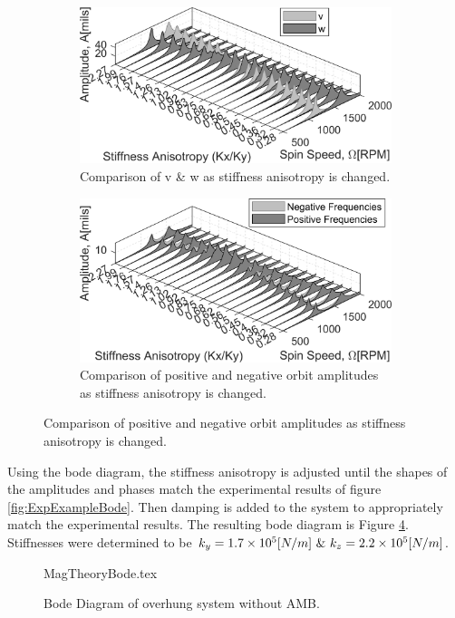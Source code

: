 \begin{figure}
\begin{subfigure}{\textwidth/2}
	\centering
	\includegraphics[width=\linewidth]{./figures/MagExampleHorVertStiffAniCompare.png}
	\caption{Comparison of v \& w as stiffness anisotropy is changed.}
	\label{fig:HorVertStiffAniCompare}
\end{subfigure}
\begin{subfigure}{\textwidth/2}
	\centering
	\includegraphics[width=\linewidth]{./figures/MagExamplePosNegStiffAniCompare.png}
	\caption{Comparison of positive and negative orbit amplitudes as stiffness anisotropy is changed.}
	\label{fig:PosNegStiffAniCompare}
\end{subfigure}
\end{figure}
Using the bode diagram, the stiffness anisotropy is adjusted until the shapes of the amplitudes and phases match the experimental results of figure \ref{fig:ExpExampleBode}. Then damping is added to the system to appropriately match the experimental results. The resulting bode diagram is Figure \ref{fig:MagTheoryBode}. Stiffnesses were determined to be $ k_y=1.7\e{5}[N/m]\ \&\ k_z=2.2\e{5}[N/m] $.
\begin{figure}[!htb]
	\def\width{.6\linewidth}
	\def\height{.4\linewidth}
	\def\sep{3em}
	\centering
	{MagTheoryBode.tex}
	\caption{Bode Diagram of overhung system without AMB.}
	\label{fig:MagTheoryBode}
\end{figure}
